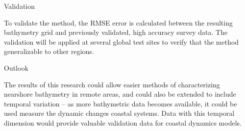 Validation

To validate the method, the RMSE error is calculated between the resulting bathymetry grid and previously validated, high accuracy survey data. The validation will be applied at several global test sites to verify that the method generalizable to other regions.

Outlook

The results of this research could allow easier methods of characterizing nearshore bathymetry in remote areas, and could also be extended to include temporal variation – as more bathymetric data becomes available, it could be used measure the dynamic changes coastal systems. Data with this temporal dimension would provide valuable validation data for coastal dynamics models.
